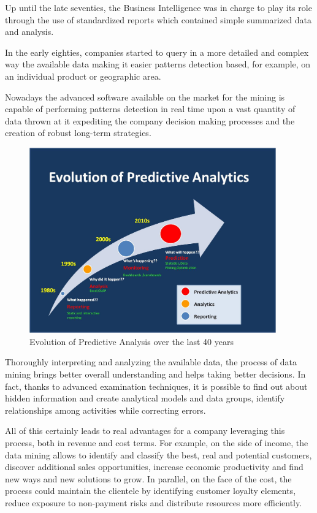 Up until the late seventies, the Business Intelligence was in charge to play its role through the use of standardized reports which contained simple summarized data and analysis.

In the early eighties, companies started to query in a more detailed and complex way the available data making it easier patterns detection based, for example, on an individual product or geographic area.

Nowadays the advanced software available on the market for the mining is capable of performing patterns detection in real time upon a vast quantity of data thrown at it expediting the company decision making processes and the creation of robust long-term strategies.

\vspace{0.5cm}
\begin{figure}[htbp]
  \centering
    \includegraphics[height=8cm]{images/evolution}
  \caption{Evolution of Predictive Analysis over the last 40 years}
  \label{fig:predict}
\end{figure}
\vspace{0.5cm}
 

Thoroughly interpreting and analyzing the available data, the process of data mining brings better overall understanding and helps taking better decisions.
In fact, thanks to advanced examination techniques, it is possible to find out about hidden information and create analytical models and data groups, identify relationships among activities while correcting errors.

All of this certainly leads to real advantages for a company leveraging this process, both in revenue and cost terms. For example,  on the side of income, the data mining allows to identify and classify the best, real and potential customers, discover additional sales opportunities, increase economic productivity and find new ways and new solutions to grow. In parallel, on the face of the cost, the process could maintain the clientele by identifying customer loyalty elements, reduce exposure to non-payment risks and distribute resources more efficiently.
 

